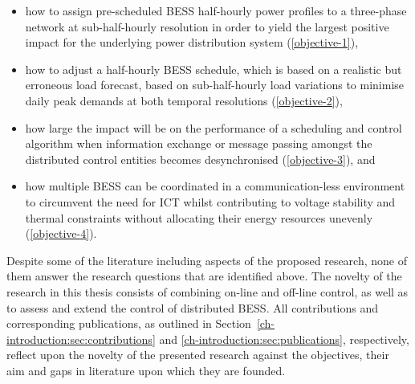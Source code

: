 \begin{itemize}
	\item how to assign pre-scheduled BESS half-hourly power profiles to a three-phase network at sub-half-hourly resolution in order to yield the largest positive impact for the underlying power distribution system (\ref{objective-1}),
	\item how to adjust a half-hourly BESS schedule, which is based on a realistic but erroneous load forecast, based on sub-half-hourly load variations to minimise daily peak demands at both temporal resolutions (\ref{objective-2}),
	\item how large the impact will be on the performance of a scheduling and control algorithm when information exchange or message passing amongst the distributed control entities becomes desynchronised (\ref{objective-3}), and
	\item how multiple BESS can be coordinated in a communication-less environment to circumvent the need for ICT whilst contributing to voltage stability and thermal constraints without allocating their energy resources unevenly (\ref{objective-4}).
\end{itemize}

Despite some of the literature including aspects of the proposed research, none of them answer the research questions that are identified above.
The novelty of the research in this thesis consists of combining on-line and off-line control, as well as to assess and extend the control of distributed BESS.
All contributions and corresponding publications, as outlined in Section~\ref{ch-introduction:sec:contributions} and \ref{ch-introduction:sec:publications}, respectively, reflect upon the novelty of the presented research against the objectives, their aim and gaps in literature upon which they are founded.
